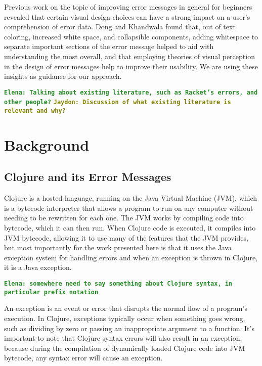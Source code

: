 \documentclass[12pt]{article}
\newcommand{\comment}[1]{{\bf \tt  {#1}}}
\newcommand{\emcomment}[1]{\textcolor{ForestGreen}{\comment{Elena: {#1}}}}
\newcommand{\tkcomment}[1]{\textcolor{Teal}{\comment{Tristan: {#1}}}}
\newcommand{\jscomment}[1]{\textcolor{olive}{\comment{Jaydon: {#1}}}}
\begin{document}
Previous work on the topic of improving error messages in general for beginners~\cite{cosmetic} revealed that certain visual design choices can have a strong impact on a user's comprehension of error data. Dong and Khandwala found that, out of text coloring, increased white space, and collapsible components, adding whitespace to separate important sections of the error message helped to aid with understanding the most overall, and that employing theories of visual perception in the design of error messages help to improve their usability. 
We are using these insights as guidance for our approach.

\emcomment{Talking about existing literature, such as Racket's errors, and other people?}
\jscomment{Discussion of what existing literature is relevant and why?}

\section{Background}\label{sec:background}

\subsection{Clojure and its Error Messages}\label{subsec:clojure-errs}
	Clojure is a hosted language, running on the Java Virtual Machine (JVM), which is a bytecode interpreter that allows a program to run on any computer without needing to be rewritten for each one. 
	The JVM works by compiling code into bytecode, which it can then run. When Clojure code is executed, it compiles into JVM bytecode, allowing it to use many of the features that the JVM provides, 
	but most importantly for the work presented here is that it uses the Java exception system for handling errors and when an exception is thrown in Clojure, it is a Java exception.

\emcomment{somewhere need to say something about Clojure syntax, in particular prefix notation}
    
   An exception is an event or error that disrupts the normal flow of a program’s execution. In Clojure, exceptions typically occur when something goes wrong, such as dividing by 
   zero or passing an inappropriate argument to a function. It’s important to note that Clojure syntax errors will also result in an exception, because during the compilation of dynamically loaded Clojure code into JVM bytecode, 
   any syntax error will 
cause an exception.
\end{document}

